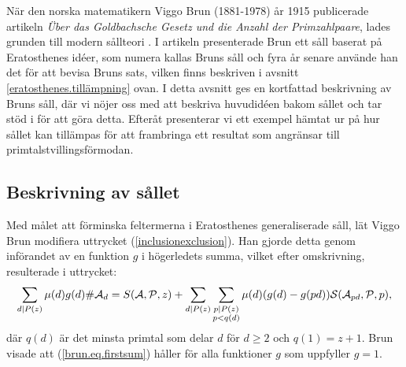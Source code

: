 \begin{comment}
När den norska matematikern Viggo Brun (1881-1978) år 1915 publicerade artikeln \textit{Über das Goldbachsche Gesetz und die Anzahl der Primzahlpaare}, lades grunden till modern sållteori \cite{ViggoBrun}. 
I artikeln presenterade Brun ett såll baserat på Eratosthenes idéer, som numera kallas Bruns såll och fyra år senare använde han det för att bevisa att summan av reciproker $\frac{1}{p_1}+\frac{1}{p_2}+...$ av primtalstvillingar $p_1,p_2,...$ konvergerar \cite{ViggoBrun}.
I detta avsnitt ges en kortfattad beskrivning av Bruns såll och ett exempel taget ur \cite{cojocarumurty} på hur sållet kan tillämpas för att ge ett resultat som angränsar till primtalstvillingsförmodan.
\end{comment}

När den norska matematikern Viggo Brun (1881-1978) år 1915 publicerade artikeln \textit{Über das Goldbachsche Gesetz und die Anzahl der Primzahlpaare}, lades grunden till modern sållteori \cite{ViggoBrun}. 
I artikeln presenterade Brun ett såll baserat på Eratosthenes idéer, som numera kallas Bruns såll och fyra år senare använde han det för att bevisa Bruns sats, vilken finns beskriven i avsnitt \ref{eratosthenes.tillämpning} ovan.
I detta avsnitt ges en kortfattad beskrivning av Bruns såll, där vi nöjer oss med att beskriva huvudidéen bakom sållet och tar stöd i \cite[kap 6.2]{cojocarumurty} för att göra detta. Efteråt presenterar vi ett exempel hämtat ur \cite{cojocarumurty} på hur sållet kan tillämpas för att frambringa ett resultat som angränsar till primtalstvillingsförmodan.


\subsection{Beskrivning av sållet}
Med målet att förminska feltermerna i Eratosthenes generaliserade såll, lät Viggo Brun modifiera uttrycket (\ref{inclusionexclusion}). 
Han gjorde detta genom införandet av en funktion $g$ i högerledets summa, vilket efter omskrivning, resulterade i uttrycket:
\begin{equation}\label{brun.eq.firstsum}
    \sum_{d \mid P(z)} \mu(d) g(d) \# \mathcal{A}_d = S(\mathcal{A}, \mathcal{P}, z) + \sum_{d \mid P(z)} \sum_{\substack{p \mid P(z) \\ p<q(d)}} \mu(d) (g(d)-g(pd))\mathcal{S}(\mathcal{A}_{pd},\mathcal{P},p),
\end{equation}
där $q(d)$ är det minsta primtal som delar $d$ för $d\geq2$ och $q(1)=z+1$. Brun visade att (\ref{brun.eq.firstsum}) håller för alla funktioner $g$ som uppfyller $g=1$.

